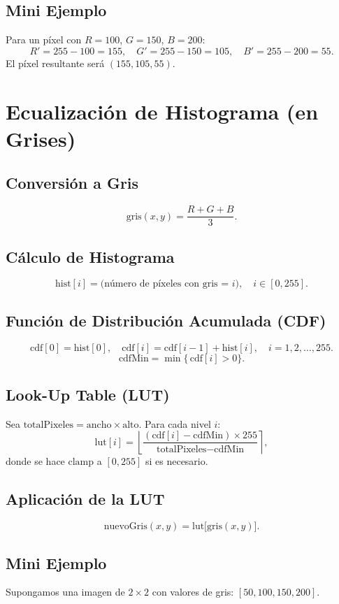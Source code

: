 \documentclass[11pt]{article}
\begin{document}
\subsection{Mini Ejemplo}
Para un píxel con \(R = 100\), \(G = 150\), \(B = 200\):
\[
R' = 255 - 100 = 155, \quad
G' = 255 - 150 = 105, \quad
B' = 255 - 200 = 55.
\]
El píxel resultante será \((155, 105, 55)\).

\section{Ecualización de Histograma (en Grises)}

\subsection{Conversión a Gris}
\[
\text{gris}(x, y) = \frac{R + G + B}{3}.
\]

\subsection{Cálculo de Histograma}
\[
\text{hist}[i] = \text{(número de píxeles con gris = } i), \quad i \in [0, 255].
\]

\subsection{Función de Distribución Acumulada (CDF)}
\[
\text{cdf}[0] = \text{hist}[0], \quad
\text{cdf}[i] = \text{cdf}[i - 1] + \text{hist}[i], \quad i = 1, 2, \ldots, 255.
\]
\[
\text{cdfMin} = \min \bigl\{\,\text{cdf}[i] > 0\bigr\}.
\]

\subsection{Look-Up Table (LUT)}
Sea \(\text{totalPixeles} = \text{ancho} \times \text{alto}\). Para cada nivel \(i\):
\[
\text{lut}[i] = \left\lfloor \frac{(\text{cdf}[i] - \text{cdfMin}) \times 255}{\text{totalPixeles} - \text{cdfMin}} \right\rceil,
\]
donde se hace \(\text{clamp}\) a \([0, 255]\) si es necesario.

\subsection{Aplicación de la LUT}
\[
\text{nuevoGris}(x, y) = \text{lut}\bigl[\text{gris}(x, y)\bigr].
\]

\subsection{Mini Ejemplo}
Supongamos una imagen de \(2 \times 2\) con valores de gris: \([50, 100, 150, 200]\).
\end{document}
